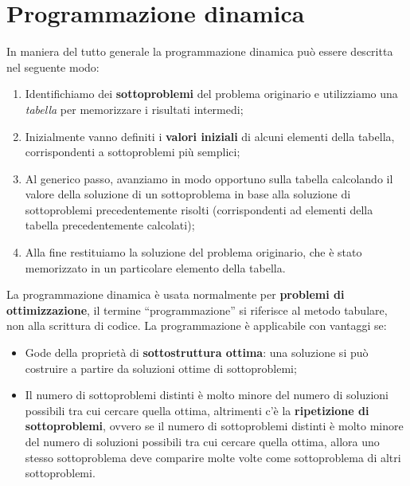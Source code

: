 \section{Programmazione dinamica}

In maniera del tutto generale la programmazione dinamica può essere descritta nel seguente modo:

\begin{enumerate}

\item Identifichiamo dei \textbf{sottoproblemi} del problema originario e utilizziamo una \textit{tabella} per memorizzare i risultati intermedi;
\item Inizialmente vanno definiti i \textbf{valori iniziali} di alcuni elementi della tabella, corrispondenti a sottoproblemi più semplici;
\item Al generico passo, avanziamo in modo opportuno sulla tabella calcolando il valore della soluzione di un sottoproblema in base alla soluzione di sottoproblemi precedentemente risolti (corrispondenti ad elementi della tabella precedentemente calcolati);
\item Alla fine restituiamo la soluzione del problema originario, che è stato memorizzato in un particolare elemento della tabella.

\end{enumerate}

La programmazione dinamica è usata normalmente per \textbf{problemi di ottimizzazione}, il termine ``programmazione'' si riferisce al metodo tabulare, non alla scrittura di codice.
\linebreak
\linebreak
La programmazione è applicabile con vantaggi se:

\begin{itemize}

\item Gode della proprietà di \textbf{sottostruttura ottima}: una soluzione si può costruire a partire da soluzioni ottime di sottoproblemi;
\item Il numero di sottoproblemi distinti è molto minore del numero di soluzioni possibili tra cui cercare quella ottima, altrimenti c'è la \textbf{ripetizione di sottoproblemi}, ovvero se il numero di sottoproblemi distinti è molto minore del numero di soluzioni possibili tra cui cercare quella ottima, allora uno stesso sottoproblema deve comparire molte volte come sottoproblema di altri sottoproblemi.

\end{itemize}

